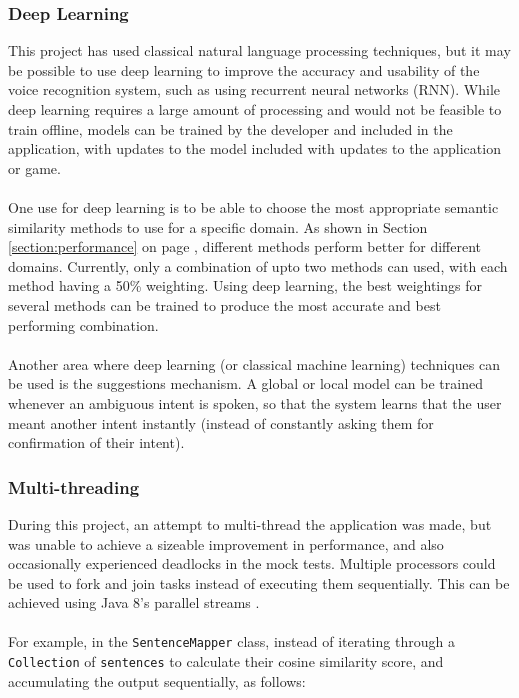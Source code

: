 \documentclass[11pt]{article}
\begin{document}
\subsubsection{Deep Learning}

This project has used classical natural language processing techniques, but it may be possible to use deep learning to improve the accuracy and usability of the voice recognition system, such as using recurrent neural networks (RNN). While deep learning requires a large amount of processing and would not be feasible to train offline, models can be trained by the developer and included in the application, with updates to the model included with updates to the application or game.
\\
\\
One use for deep learning is to be able to choose the most appropriate semantic similarity methods to use for a specific domain. As shown in Section \ref{section:performance} on page \pageref{section:eval-similarity}, different methods perform better for different domains. Currently, only a combination of upto two methods can used, with each method having a 50\% weighting. Using deep learning, the best weightings for several methods can be trained to produce the most accurate and best performing combination.
\\
\\
Another area where deep learning (or classical machine learning) techniques can be used is the suggestions mechanism. A global or local model can be trained whenever an ambiguous intent is spoken, so that the system learns that the user meant another intent instantly (instead of constantly asking them for confirmation of their intent).


\subsubsection{Multi-threading}

During this project, an attempt to multi-thread the application was made, but was unable to achieve a sizeable improvement in performance, and also occasionally experienced deadlocks in the mock tests. Multiple processors could be used to fork and join tasks instead of executing them sequentially. This can be achieved using Java 8's parallel streams \cite{RefWorks:132}.
\\
\\
For example, in the \texttt{SentenceMapper} class, instead of iterating through a \texttt{Collection} of \texttt{sentences} to calculate their cosine similarity score, and accumulating the output sequentially, as follows:
\end{document}
